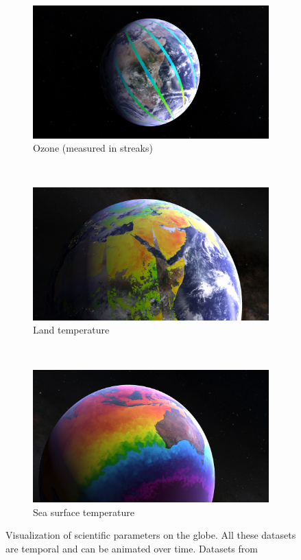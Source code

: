 \begin{figure}[h]
    \centering
    \begin{subfigure}[t]{0.45\textwidth}
        \includegraphics[width=\textwidth]{figures/results/screenshots_science_params/ozone.jpg}
        \caption{Ozone (measured in streaks)}
    \end{subfigure}
    ~
    \begin{subfigure}[t]{0.45\textwidth}
        \includegraphics[width=\textwidth]{figures/results/screenshots_science_params/land_temp.jpg}
        \caption{Land temperature}
    \end{subfigure}
    ~
    \begin{subfigure}[t]{0.90\textwidth}
        \includegraphics[width=\textwidth]{figures/results/screenshots_science_params/sea_surface.jpg}
        \caption{Sea surface temperature}
    \end{subfigure}
    \caption{Visualization of scientific parameters on the globe. All these datasets are temporal and can be animated over time. Datasets from \cite{gibs}}
    \label{fig:sciparam}
\end{figure}

